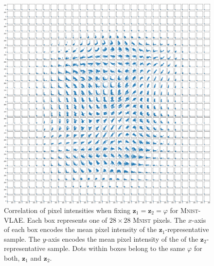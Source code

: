 \begin{figure}
    \centering
    \includegraphics[width=\textwidth]{images/notprop/mnist/vlae/ccs_0_1_vlae.png}
    \caption[\textsc{Mnist}-VLAE - Pixel intensity correlation]{Correlation of pixel intensities when fixing $\bm{z}_1 = \bm{z}_2=\varphi$ for \textsc{Mnist}-\ac{VLAE}. Each box represents one of $28\times 28$ \textsc{Mnist} pixels. The $x$-axis of each box encodes the mean pixel intensity of the $\bm{z}_1$-representative sample. The $y$-axis encodes the mean pixel intensity of the of the $\bm{z}_2$-representative sample. Dots within boxes belong to the same $\varphi$ for both, $\bm{z}_1$ and $\bm{z}_2$. }
    \label{fig:notprop}
\end{figure}

